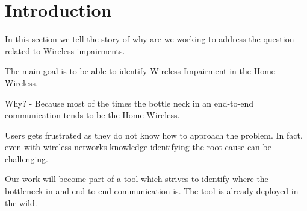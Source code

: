 \section{Introduction}\label{Introduction}

In this section we tell the story of why are we working to address the question related to Wireless impairments.

The main goal is to be able to identify Wireless Impairment in the Home Wireless.

Why? - Because most of the times the bottle neck in an end-to-end communication tends to be the Home Wireless.

Users gets frustrated as they do not know how to approach the problem. In fact, even with wireless networks knowledge identifying the root cause can be challenging.

Our work will become part of a tool which strives to identify where the bottleneck in and end-to-end communication is. The tool is already deployed in the wild.